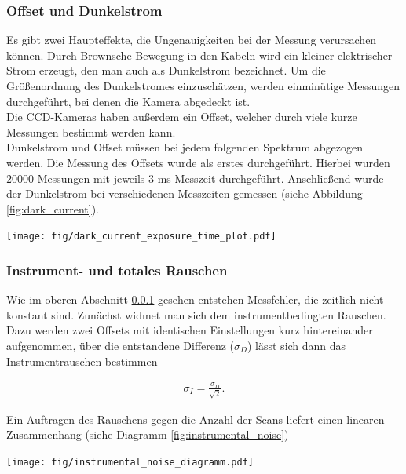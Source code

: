 \documentclass[12pt, a4paper, bibliography=totoc]{scrartcl}
\begin{document}
\begin{multicols}{2}
\subsubsection{Offset und Dunkelstrom}\label{sssec:O&D}

Es gibt zwei Haupteffekte, die Ungenauigkeiten bei der Messung verursachen können.
Durch Brownsche Bewegung in den Kabeln wird ein kleiner elektrischer Strom erzeugt, den man auch als Dunkelstrom bezeichnet.
Um die Größenordnung des Dunkelstromes einzuschätzen, werden einminütige Messungen durchgeführt, bei denen die Kamera abgedeckt ist.\\
Die CCD-Kameras haben außerdem ein Offset, welcher durch viele kurze Messungen bestimmt werden kann.\\
Dunkelstrom und Offset müssen bei jedem folgenden Spektrum abgezogen werden.
Die Messung des Offsets wurde als erstes durchgeführt. 
Hierbei wurden $20000$ Messungen mit jeweils $3$ \si{ms} Messzeit durchgeführt.
Anschließend wurde der Dunkelstrom bei verschiedenen Messzeiten gemessen (siehe Abbildung \ref{fig:dark_current}).
    
\begin{center}
	\texttt{[image: fig/dark\_current\_exposure\_time\_plot.pdf]}
	\label{fig:dark_current}
\end{center}

\subsubsection{Instrument- und totales Rauschen}\label{sssec:instrumental_total_noise}

Wie im oberen Abschnitt \ref{sssec:O&D} gesehen entstehen Messfehler, die zeitlich nicht konstant sind. Zunächst widmet man sich dem instrumentbedingten Rauschen.
Dazu werden zwei Offsets mit identischen Einstellungen kurz hintereinander aufgenommen, über die entstandene Differenz ($\sigma_D$) lässt sich dann das Instrumentrauschen bestimmen 

\begin{align}
\sigma_{I} = \frac{\sigma_D}{\sqrt{2}}.\label{eq:instrumental_noise}
\end{align}

Ein Auftragen des Rauschens gegen die Anzahl der Scans liefert einen linearen Zusammenhang (siehe Diagramm \ref{fig:instrumental_noise})

\begin{center}
	\texttt{[image: fig/instrumental\_noise\_diagramm.pdf]}
	\label{fig:instrumental_noise}
\end{center}  


\end{multicols}
\end{document}
